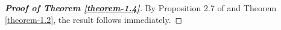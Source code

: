 \documentclass[11pt]{amsart}
\theoremstyle{plain}
\numberwithin{equation}{section}
\begin{document}
		\begin{proof}[\textbf{\boldmath Proof of Theorem \ref{theorem-1.4}}]
			By Proposition 2.7 of \cite{barman2025lower} and Theorem \ref{theorem-1.2}, the result follows immediately.
		\end{proof}
		
							
		  				
	
\end{document}

